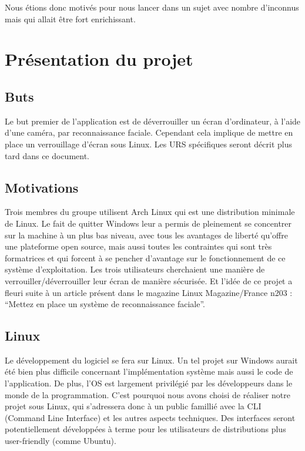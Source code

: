\documentclass[french]{report}
\begin{document}
Nous étions donc motivés pour nous lancer dans un sujet avec nombre d’inconnus
mais qui allait être fort enrichissant.


\section{Présentation du projet}

\subsection{Buts}
Le but premier de l’application est de déverrouiller un écran d’ordinateur, à
l’aide d’une caméra, par reconnaissance faciale. Cependant cela implique de
mettre en place un verrouillage d’écran sous Linux. Les URS spécifiques seront
décrit plus tard dans ce document.

\subsection{Motivations}
Trois membres du groupe utilisent Arch Linux qui est une distribution minimale
de Linux. Le fait de quitter Windows leur a permis de pleinement se concentrer
sur la machine à un plus bas niveau, avec tous les avantages de liberté
qu’offre une plateforme open source, mais aussi toutes les contraintes qui sont
très formatrices et qui forcent à se pencher d’avantage sur le fonctionnement
de ce système d’exploitation. Les trois utilisateurs cherchaient une manière de
verrouiller/déverrouiller leur écran de manière sécurisée. Et l’idée de ce
projet a fleuri suite à un article présent dans le magazine Linux
Magazine/France n{\degree}203 : “Mettez en place un système de reconnaissance faciale”.

\subsection{Linux}
Le développement du logiciel se fera sur Linux. Un tel projet
sur Windows aurait été bien plus difficile concernant l’implémentation système
mais aussi le code de l’application. De plus, l’OS est largement privilégié par
les développeurs dans le monde de la programmation. C’est pourquoi nous avons
choisi de réaliser notre projet sous Linux, qui s’adressera donc à un public
famillié avec la CLI (Command Line Interface) et les autres aspects techniques.
Des interfaces seront potentiellement développées à terme pour les utilisateurs
de distributions plus user-friendly (comme Ubuntu).
\end{document}

